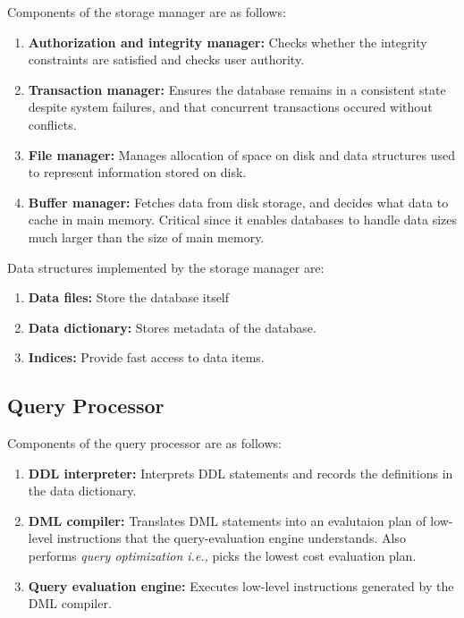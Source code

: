\documentclass[journal,12pt,twocolumn]{IEEEtran}
\begin{document}
Components of the storage manager are as follows:
\begin{enumerate}
    \item \textbf{Authorization and integrity manager:} Checks whether the 
    integrity constraints are satisfied and checks user authority.
    \item \textbf{Transaction manager:} Ensures the database remains in a 
    consistent state despite system failures, and that concurrent transactions 
    occured without conflicts.
    \item \textbf{File manager:} Manages allocation of space on disk and data 
    structures used to represent information stored on disk.
    \item \textbf{Buffer manager:} Fetches data from disk storage, and decides 
    what data to cache in main memory. Critical since it enables databases to 
    handle data sizes much larger than the size of main memory.
\end{enumerate}

Data structures implemented by the storage manager are:
\begin{enumerate}
    \item \textbf{Data files:} Store the database itself
    \item \textbf{Data dictionary:} Stores metadata of the database.
    \item \textbf{Indices:} Provide fast access to data items.
\end{enumerate}

\subsection{Query Processor}

Components of the query processor are as follows:
\begin{enumerate}
    \item \textbf{DDL interpreter:} Interprets DDL statements and records the 
    definitions in the data dictionary.
    \item \textbf{DML compiler:} Translates DML statements into an evalutaion 
    plan of low-level instructions that the query-evaluation engine understands.
    Also performs \textit{query optimization i.e.,} picks the lowest cost 
    evaluation plan.
    \item \textbf{Query evaluation engine:} Executes low-level instructions 
    generated by the DML compiler.
\end{enumerate}
\end{document}
